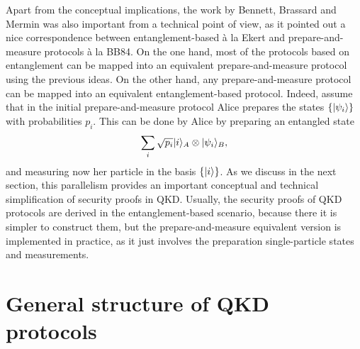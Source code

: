 \documentclass[a4paper]{article}
\begin{document}
Apart from the conceptual implications, the work by Bennett,
Brassard and Mermin was also important from a technical point of
view, as it pointed out a nice correspondence between entanglement-based
\`a la Ekert and prepare-and-measure protocols \`a la BB84. On the one hand, most of
the protocols based on entanglement can be mapped into an
equivalent prepare-and-measure protocol using the previous
ideas. On the other hand,
any prepare-and-measure protocol can be mapped into an equivalent
entanglement-based protocol. Indeed, assume that in the initial
prepare-and-measure protocol Alice prepares the states
$\{|\psi_i\rangle\}$ with probabilities $p_i$. This can be done by
Alice by preparing an entangled state
\begin{equation}
    \sum_i \sqrt{p_i}|i\rangle_A\otimes|\psi_i\rangle_B ,
\end{equation}
and measuring now her particle in the basis $\{|i\rangle\}$. 
As we discuss in the next section, this parallelism provides an
important conceptual and technical simplification of security
proofs in QKD. Usually, the security  proofs of QKD protocols are derived in the 
entanglement-based scenario, because there it is simpler to construct them, but the prepare-and-measure equivalent version is implemented in practice, as it just involves the preparation single-particle states and measurements.

\section{General structure of QKD protocols}
\end{document}
